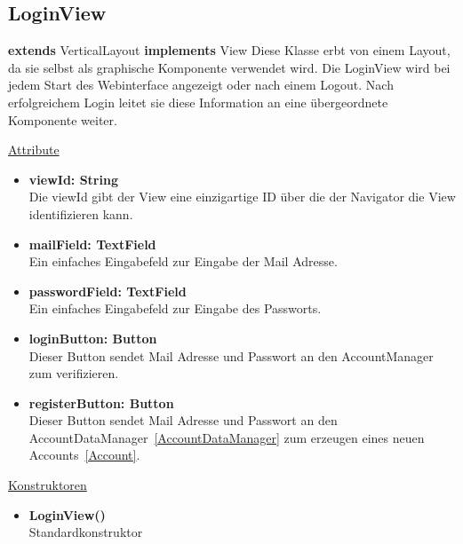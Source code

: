 \newpage
\subsection{LoginView}\label{LoginView}
\textbf{extends}  VerticalLayout \newline
\textbf{implements} View \newline
Diese Klasse erbt von einem Layout, da sie selbst als graphische Komponente verwendet wird. Die LoginView wird bei jedem Start des Webinterface angezeigt oder nach einem Logout. Nach erfolgreichem Login leitet sie diese Information an eine übergeordnete Komponente weiter.
\newline

\underline{Attribute}
\begin{itemize}
\itemsep0pt
\item \textbf{viewId: String} \hfill\\ 
Die viewId gibt der View eine einzigartige ID über die der Navigator die View identifizieren kann.

\item \textbf{mailField: TextField} \hfill\\ 
Ein einfaches Eingabefeld zur Eingabe der Mail Adresse.

\item \textbf{passwordField: TextField} \hfill\\
Ein einfaches Eingabefeld zur Eingabe des Passworts.

\item \textbf{loginButton: Button} \hfill\\
Dieser Button sendet Mail Adresse und Passwort an den AccountManager zum verifizieren.

\item \textbf{registerButton: Button} \hfill\\
Dieser Button sendet Mail Adresse und Passwort an den AccountDataManager~\eqref{AccountDataManager} zum erzeugen eines neuen Accounts~\eqref{Account}.

\end{itemize}

\underline{Konstruktoren}
\begin{itemize}
\itemsep0pt
\item \textbf{LoginView()} \hfill\\
Standardkonstruktor
\end{itemize}

